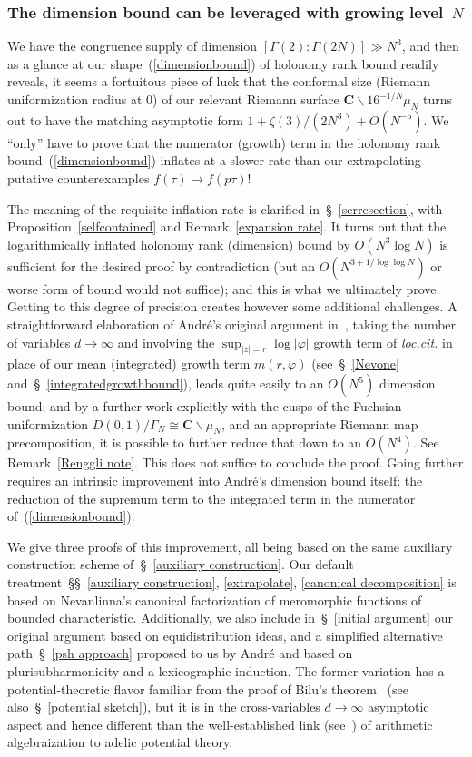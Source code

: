\documentclass[10pt]{amsart}
\def\SSSS{\S}
\def\SSSSs{\S\S}
\renewcommand\setminus{\smallsetminus}
\theoremstyle{remark}
\numberwithin{equation}{subsection}
\def\C{\mathbf{C}}
\begin{document}
\subsubsection{The dimension bound can be leveraged with growing level~$N$}
 We have the congruence supply of dimension $[\Gamma(2) : \Gamma(2N)] \gg N^3$, and then 
 as a glance at our shape~(\ref{dimensionbound}) of holonomy rank bound readily reveals, it seems a fortuitous piece 
of luck that the conformal size (Riemann uniformization radius at $0$) of our relevant Riemann surface $\C \setminus 16^{-1/N} \mu_N$ turns out to have the matching asymptotic form $1 + \zeta(3) / (2N^3) + O(N^{-5})$.  
We ``only'' have to prove that the numerator (growth) term in the holonomy rank bound~(\ref{dimensionbound}) inflates at a slower rate than our extrapolating putative counterexamples $f(\tau) \mapsto f(p \tau)$! 

The meaning of the requisite inflation rate is clarified in~\SSSS~\ref{serresection}, with Proposition~\ref{selfcontained}
and Remark~\ref{expansion rate}. It turns out that the logarithmically inflated holonomy rank (dimension) bound 
by $O(N^3\log{N})$ is sufficient for the desired proof by contradiction (but an $O(N^{3 + 1 / \log{\log{N}}})$ or worse form of bound would not suffice); and this is what we ultimately prove. Getting to this degree of precision
creates however some additional challenges. A straightforward elaboration of Andr\'e's original argument in~\cite[Criterium VIII~1.6]{AndreG}, taking the number of variables $d \to \infty$  and  involving the $\sup_{|z| = r}\log{ |\varphi|}$ growth term of  {\it loc.cit.} in place of our mean (integrated) growth term $m(r,\varphi)$ (see~\SSSS~\ref{Nevone} and~\SSSS~\ref{integratedgrowthbound}), leads quite easily to an $O(N^5)$ dimension bound; and 
 by a further work explicitly with the cusps of the Fuchsian uniformization $D(0,1) / \Gamma_N \cong \C \setminus \mu_N$, and an appropriate Riemann map precomposition, it is possible to further reduce that down to an $O(N^4)$. See Remark~\ref{Renggli note}. This does not suffice to conclude the proof. Going further requires an intrinsic improvement into Andr\'e's dimension bound itself: the reduction of the supremum term to the integrated term in the numerator of~(\ref{dimensionbound}). 

We  give three proofs of this improvement, all being based on the same auxiliary construction scheme of~\SSSS~\ref{auxiliary construction}.  Our default treatment~\SSSSs~\ref{auxiliary construction},  \ref{extrapolate}, \ref{canonical decomposition} is   based on Nevanlinna's canonical factorization of meromorphic functions of bounded characteristic. Additionally, we also include in~\SSSS~\ref{initial argument} our original argument  based on equidistribution ideas, and a simplified alternative path~\SSSS~\ref{psh approach} proposed to us by Andr\'e and based on plurisubharmonicity and a lexicographic induction. 
The former variation has  a 
potential-theoretic flavor familiar from the proof of Bilu's  theorem~\cite{Bilu} (see also~\SSSS~\ref{potential sketch}), but it is 
 in the cross-variables $d \to \infty$ asymptotic aspect and hence different than the well-established link (see~\cite{Bost,BCL,BostGerms}) of arithmetic algebraization to adelic potential theory. 
\end{document}
